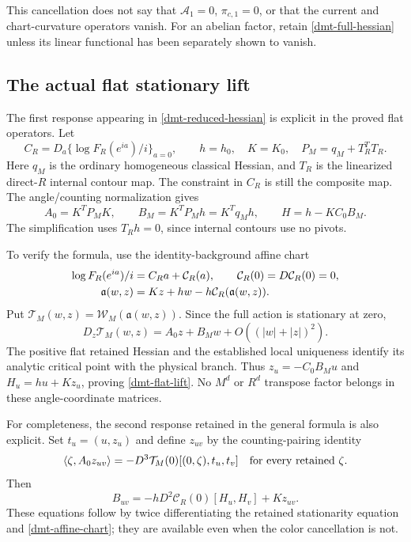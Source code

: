 This cancellation does not say that
\(\mathscr A_1=0\), \(\pi_{c,1}=0\), or that the current and
chart-curvature operators vanish. For an abelian factor,
retain \eqref{dmt-full-hessian} unless its linear functional
has been separately shown to vanish.

\subsection{The actual flat stationary lift}
\label{dmt-lift-section}

The first response appearing in
\eqref{dmt-reduced-hessian} is explicit in the proved flat
operators. Let
\begin{equation}
 C_R=D_a\{\log F_R(e^{ia})/i\}_{a=0},\qquad
 h=h_0,\quad K=K_0,\quad P_M=q_M+T_R^TT_R.
 \label{dmt-flat-data}
\end{equation}
Here \(q_M\) is the ordinary homogeneous classical Hessian,
and \(T_R\) is the linearized direct-\(R\) internal contour
map. The constraint in \(C_R\) is still the composite map.
The angle/counting normalization gives
\begin{equation}
 A_0=K^TP_MK,\qquad
 B_M=K^TP_Mh=K^Tq_Mh,\qquad
 H=h-KC_0B_M.
 \label{dmt-flat-lift}
\end{equation}
The simplification uses \(T_Rh=0\), since internal contours
use no pivots.

To verify the formula, use the identity-background affine
chart
\begin{align}
 \log F_R(e^{ia})/i&=C_Ra+\mathcal C_R(a),
 \qquad \mathcal C_R(0)=D\mathcal C_R(0)=0,\notag\\
 \mathfrak a(w,z)&=Kz+hw-h\mathcal C_R(\mathfrak a(w,z)).
 \label{dmt-affine-chart}
\end{align}
Put
\(\mathcal T_M(w,z)=\mathcal W_M(\mathfrak a(w,z))\).
Since the full action is stationary at zero,
\begin{equation}
 D_z\mathcal T_M(w,z)
       =A_0z+B_Mw+O((|w|+|z|)^2).
 \label{dmt-affine-stationarity}
\end{equation}
The positive flat retained Hessian and the established
local uniqueness identify its analytic critical point
with the physical branch. Thus
\(z_u=-C_0B_Mu\) and \(H_u=hu+Kz_u\), proving
\eqref{dmt-flat-lift}. No \(M^d\) or \(R^d\) transpose
factor belongs in these angle-coordinate matrices.

For completeness, the second response retained in the
general formula is also explicit. Set \(t_u=(u,z_u)\)
and define \(z_{uv}\) by the counting-pairing identity
\begin{equation}
 \langle\zeta,A_0z_{uv}\rangle
       =-D^3\mathcal T_M(0)[(0,\zeta),t_u,t_v]
       \quad\hbox{for every retained }\zeta.
 \label{dmt-second-stationary}
\end{equation}
Then
\begin{equation}
 B_{uv}=-hD^2\mathcal C_R(0)[H_u,H_v]+Kz_{uv}.
 \label{dmt-second-background}
\end{equation}
These equations follow by twice differentiating the retained
stationarity equation and \eqref{dmt-affine-chart}; they are
available even when the color cancellation is not.

